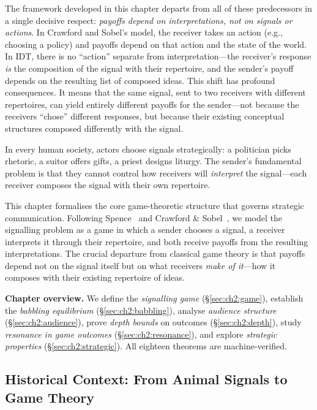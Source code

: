 The framework developed in this chapter departs from all of these
predecessors in a single decisive respect: \emph{payoffs depend on
interpretations, not on signals or actions}.  In Crawford and Sobel's
model, the receiver takes an action (e.g., choosing a policy) and
payoffs depend on that action and the state of the world.  In IDT,
there is no ``action'' separate from interpretation---the receiver's
response \emph{is} the composition of the signal with their repertoire,
and the sender's payoff depends on the resulting list of composed
ideas.  This shift has profound consequences.  It means that the
same signal, sent to two receivers with different repertoires, can
yield entirely different payoffs for the sender---not because the
receivers ``chose'' different responses, but because their existing
conceptual structures composed differently with the signal.

In every human society, actors choose signals strategically: a politician
picks rhetoric, a suitor offers gifts, a priest designs liturgy.  The
sender's fundamental problem is that they cannot control how receivers
will \emph{interpret} the signal---each receiver composes the signal with
their own repertoire.

This chapter formalises the core game-theoretic structure that governs
strategic communication.  Following Spence~\cite{spence1973} and
Crawford \& Sobel~\cite{crawford1982}, we model the signalling problem
as a game in which a sender chooses a signal, a receiver interprets it
through their repertoire, and both receive payoffs from the resulting
interpretations.  The crucial departure from classical game theory is
that payoffs depend not on the signal itself but on what receivers
\emph{make of it}---how it composes with their existing repertoire of
ideas.

\medskip
\noindent\textbf{Chapter overview.}  We define the \emph{signalling game}
(\S\ref{sec:ch2:game}), establish the \emph{babbling equilibrium}
(\S\ref{sec:ch2:babbling}), analyse \emph{audience structure}
(\S\ref{sec:ch2:audience}), prove \emph{depth bounds} on outcomes
(\S\ref{sec:ch2:depth}), study \emph{resonance in game outcomes}
(\S\ref{sec:ch2:resonance}), and explore \emph{strategic properties}
(\S\ref{sec:ch2:strategic}).  All eighteen theorems are machine-verified.

\subsection*{Historical Context: From Animal Signals to Game Theory}

